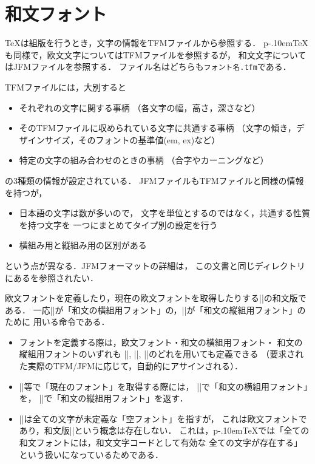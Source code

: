 \documentclass[a4paper,11pt,nomag]{jsarticle}
\def\code#1{\texttt{#1}}
\def\pTeX{p\kern-.10em\TeX}
\begin{document}
\section{和文フォント}
\label{sec:ptexfont}

\TeX は組版を行うとき，文字の情報をTFMファイルから参照する．
\pTeX も同様で，欧文文字についてはTFMファイルを参照するが，
和文文字についてはJFMファイルを参照する．
ファイル名はどちらも\code{フォント名.tfm}である．

TFMファイルには，大別すると
\begin{itemize}
 \item それぞれの文字に関する事柄
   （各文字の幅，高さ，深さなど）
 \item そのTFMファイルに収められている文字に共通する事柄
   （文字の傾き，デザインサイズ，そのフォントの基準値(em, ex)など）
 \item 特定の文字の組み合わせのときの事柄
   （合字やカーニングなど）
\end{itemize}
の3種類の情報が設定されている．
JFMファイルもTFMファイルと同様の情報を持つが，
\begin{itemize}
 \item 日本語の文字は数が多いので，
   文字を単位とするのではなく，共通する性質を持つ文字を
   一つにまとめてタイプ別の設定を行う
 \item 横組み用と縦組み用の区別がある
\end{itemize}
という点が異なる．JFMフォーマットの詳細は，
この文書と同じディレクトリにある\cite{jfm}を参照されたい．


\begin{cslist}
  欧文フォントを定義したり，現在の欧文フォントを取得したりする|\font|の和文版である．
  一応|\jfont|が「和文の横組用フォント」の，|\tfont|が「和文の縦組用フォント」のために
  用いる命令である．
\begin{itemize}
 \item フォントを定義する際は，欧文フォント・和文の横組用フォント・
       和文の縦組用フォントのいずれも
       |\font|, |\jfont|, |\tfont|のどれを用いても定義できる
       （要求された実際のTFM/JFMに応じて，自動的にアサインされる）．
 \item |\the|等で「現在のフォント」を取得する際には，
       |\jfont|で「和文の横組用フォント」を，
       |\tfont|で「和文の縦組用フォント」を返す．
 \item |\nullfont|は全ての文字が未定義な「空フォント」を指すが，
  これは欧文フォントであり，和文版|\nullfont|という概念は存在しない．
  これは，\pTeX では「全ての和文フォントには，和文文字コードとして有効な
  全ての文字が存在する」という扱いになっているためである．
\end{itemize}
\end{cslist}
\end{document}
